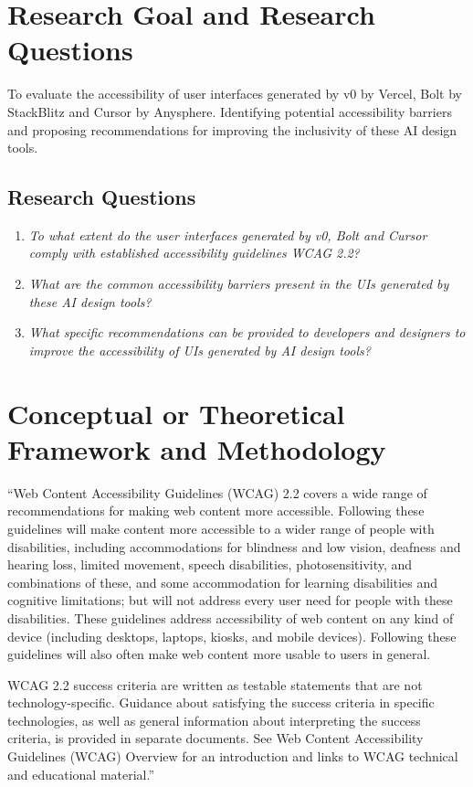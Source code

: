 \documentclass{article}
\begin{document}
\section{Research Goal and Research Questions}
To evaluate the accessibility of user interfaces generated by v0 by Vercel, Bolt by StackBlitz and Cursor by Anysphere.
Identifying potential accessibility barriers and proposing recommendations for improving the inclusivity of these AI design tools.

\subsection{Research Questions}

\begin{enumerate}
  \item \textit{To what extent do the user interfaces generated by v0, Bolt and Cursor comply with established accessibility guidelines WCAG 2.2?}
  \item \textit{What are the common accessibility barriers present in the UIs generated by these AI design tools?}
  \item \textit{What specific recommendations can be provided to developers and designers to improve the accessibility of UIs generated by AI design tools?}
\end{enumerate}

\section{Conceptual or Theoretical Framework and Methodology}
“Web Content Accessibility Guidelines (WCAG) 2.2 covers a wide range of recommendations for making web content more accessible.
Following these guidelines will make content more accessible to a wider range of people with disabilities,
including accommodations for blindness and low vision, deafness and hearing loss, limited movement, speech disabilities, photosensitivity,
and combinations of these, and some accommodation for learning disabilities and cognitive limitations;
but will not address every user need for people with these disabilities.
These guidelines address accessibility of web content on any kind of device (including desktops, laptops, kiosks, and mobile devices).
Following these guidelines will also often make web content more usable to users in general.

WCAG 2.2 success criteria are written as testable statements that are not technology-specific.
Guidance about satisfying the success criteria in specific technologies,
as well as general information about interpreting the success criteria, is provided in separate documents.
See Web Content Accessibility Guidelines (WCAG) Overview for an introduction and links to WCAG technical and educational material.” \cite{wcag_2.2}
\end{document}
